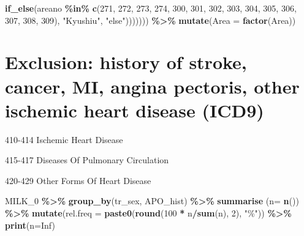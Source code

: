\documentclass[
]{article}
\newenvironment{Shaded}{\begin{snugshade}}{\end{snugshade}}
\newcommand{\DataTypeTok}[1]{\textcolor[rgb]{0.13,0.29,0.53}{#1}}
\newcommand{\DecValTok}[1]{\textcolor[rgb]{0.00,0.00,0.81}{#1}}
\newcommand{\KeywordTok}[1]{\textcolor[rgb]{0.13,0.29,0.53}{\textbf{#1}}}
\newcommand{\NormalTok}[1]{#1}
\newcommand{\OperatorTok}[1]{\textcolor[rgb]{0.81,0.36,0.00}{\textbf{#1}}}
\newcommand{\OtherTok}[1]{\textcolor[rgb]{0.56,0.35,0.01}{#1}}
\newcommand{\StringTok}[1]{\textcolor[rgb]{0.31,0.60,0.02}{#1}}
\begin{document}
\begin{Shaded}
\begin{Highlighting}[]
                          \KeywordTok{if\_else}\NormalTok{(areano }\OperatorTok{\%in\%}\StringTok{ }\KeywordTok{c}\NormalTok{(}\DecValTok{271}\NormalTok{, }\DecValTok{272}\NormalTok{, }\DecValTok{273}\NormalTok{, }\DecValTok{274}\NormalTok{, }\DecValTok{300}\NormalTok{, }\DecValTok{301}\NormalTok{, }\DecValTok{302}\NormalTok{, }\DecValTok{303}\NormalTok{, }\DecValTok{304}\NormalTok{, }
                            \DecValTok{305}\NormalTok{, }\DecValTok{306}\NormalTok{, }\DecValTok{307}\NormalTok{, }\DecValTok{308}\NormalTok{, }\DecValTok{309}\NormalTok{), }\StringTok{"Kyushiu"}\NormalTok{, }\StringTok{"else"}\NormalTok{))))))) }\OperatorTok{\%\textgreater{}\%}\StringTok{ }
\StringTok{  }\KeywordTok{mutate}\NormalTok{(}\DataTypeTok{Area =} \KeywordTok{factor}\NormalTok{(Area))}
\end{Highlighting}
\end{Shaded}

\hypertarget{exclusion-history-of-stroke-cancer-mi-angina-pectoris-other-ischemic-heart-disease-icd9}{%
\section{Exclusion: history of stroke, cancer, MI, angina pectoris,
other ischemic heart disease
(ICD9)}\label{exclusion-history-of-stroke-cancer-mi-angina-pectoris-other-ischemic-heart-disease-icd9}}

410-414 Ischemic Heart Disease

415-417 Diseases Of Pulmonary Circulation

420-429 Other Forms Of Heart Disease

\begin{Shaded}
\begin{Highlighting}[]
\NormalTok{MILK\_}\DecValTok{0} \OperatorTok{\%\textgreater{}\%}\StringTok{ }
\StringTok{  }\KeywordTok{group\_by}\NormalTok{(tr\_sex, APO\_hist) }\OperatorTok{\%\textgreater{}\%}\StringTok{ }
\StringTok{  }\KeywordTok{summarise}\NormalTok{ (}\DataTypeTok{n=} \KeywordTok{n}\NormalTok{()) }\OperatorTok{\%\textgreater{}\%}
\StringTok{  }\KeywordTok{mutate}\NormalTok{(}\DataTypeTok{rel.freq =} \KeywordTok{paste0}\NormalTok{(}\KeywordTok{round}\NormalTok{(}\DecValTok{100} \OperatorTok{*}\StringTok{ }\NormalTok{n}\OperatorTok{/}\KeywordTok{sum}\NormalTok{(n), }\DecValTok{2}\NormalTok{), }\StringTok{"\%"}\NormalTok{))  }\OperatorTok{\%\textgreater{}\%}\StringTok{ }
\StringTok{  }\KeywordTok{print}\NormalTok{(}\DataTypeTok{n=}\OtherTok{Inf}\NormalTok{)}
\end{Highlighting}
\end{Shaded}
\end{document}
